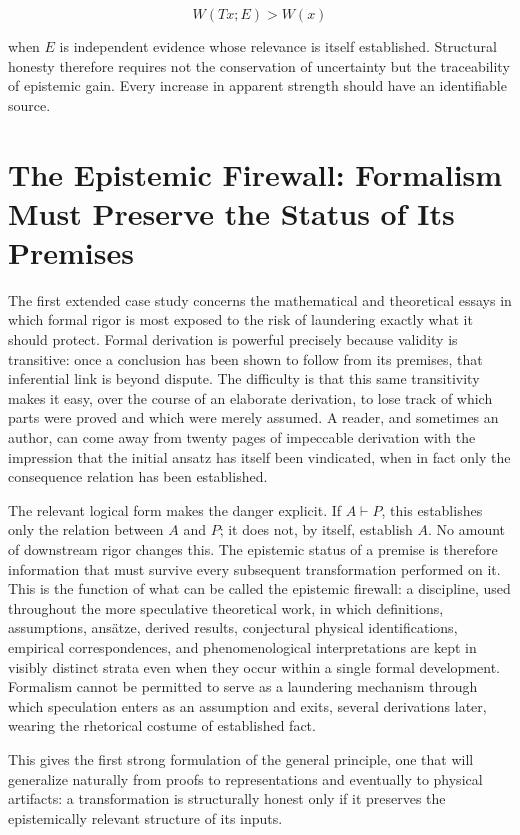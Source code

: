 \documentclass[11pt]{article}
\begin{document}
\[
W(Tx;E) > W(x)
\]

when $E$ is independent evidence whose relevance is itself established. Structural honesty therefore requires not the conservation of uncertainty but the traceability of epistemic gain. Every increase in apparent strength should have an identifiable source.

\section{The Epistemic Firewall: Formalism Must Preserve the Status of Its Premises}

The first extended case study concerns the mathematical and theoretical essays in which formal rigor is most exposed to the risk of laundering exactly what it should protect. Formal derivation is powerful precisely because validity is transitive: once a conclusion has been shown to follow from its premises, that inferential link is beyond dispute. The difficulty is that this same transitivity makes it easy, over the course of an elaborate derivation, to lose track of which parts were proved and which were merely assumed. A reader, and sometimes an author, can come away from twenty pages of impeccable derivation with the impression that the initial ansatz has itself been vindicated, when in fact only the consequence relation has been established.

The relevant logical form makes the danger explicit. If $A \vdash P$, this establishes only the relation between $A$ and $P$; it does not, by itself, establish $A$. No amount of downstream rigor changes this. The epistemic status of a premise is therefore information that must survive every subsequent transformation performed on it. This is the function of what can be called the epistemic firewall: a discipline, used throughout the more speculative theoretical work, in which definitions, assumptions, ansätze, derived results, conjectural physical identifications, empirical correspondences, and phenomenological interpretations are kept in visibly distinct strata even when they occur within a single formal development. Formalism cannot be permitted to serve as a laundering mechanism through which speculation enters as an assumption and exits, several derivations later, wearing the rhetorical costume of established fact.

This gives the first strong formulation of the general principle, one that will generalize naturally from proofs to representations and eventually to physical artifacts: a transformation is structurally honest only if it preserves the epistemically relevant structure of its inputs.
\end{document}

